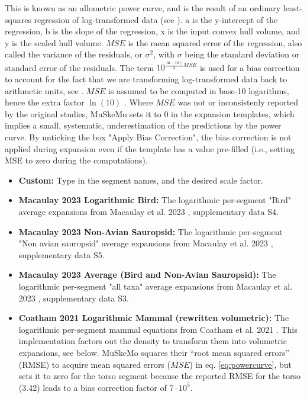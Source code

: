 \documentclass{article}
\begin{document}
This is known as an allometric power curve, and is the result of an ordinary least-squares regression of log-transformed data (see \cite{alexanderPrinciplesAnimalLocomotion2006,brasseyScalingConvexHull2014}). a is the y-intercept of the regression, b is the slope of the regression, x is the input convex hull volume, and y is the scaled hull volume. \(MSE\) is the mean squared error of the regression, also called the variance of the residuals, or $\sigma^2$, with $\sigma$ being the standard deviation or standard error of the residuals. The term $10^{\frac{\ln(10)}{2} MSE }$ is used for a bias correction to account for the fact that we are transforming log-transformed data back to arithmetic units, see \cite{baskervilleUseLogarithmicRegression1972,sprugelCorrectingBiasLogTransformed1983,smithLogarithmicTransformationBias1993}. $MSE$ is assumed to be computed in base-10 logarithms, hence the extra factor $\ln(10)$ \cite{sprugelCorrectingBiasLogTransformed1983,smithLogarithmicTransformationBias1993}. Where $MSE$ was not or inconsistenly reported by the original studies, MuSkeMo sets it to 0 in the expansion templates, which implies a small, systematic, underestimation of the predictions by the power curve. By unticking the box "Apply Bias Correction", the bias correction is not applied during expansion even if the template has a value pre-filled (i.e., setting MSE to zero during the computations).


\begin{itemize}
    \item \textbf{Custom:} Type in the segment names, and the desired scale factor.
    \item \textbf{Macaulay 2023 Logarithmic Bird:} The logarithmic per-segment "Bird" average expansions from Macaulay et al. 2023 \cite{macaulayDecouplingBodyShape2023}, supplementary data S4.
    \item \textbf{Macaulay 2023 Non-Avian Sauropsid:} The logarithmic per-segment "Non avian sauropsid" average expansions from Macaulay et al. 2023 \cite{macaulayDecouplingBodyShape2023}, supplementary data S5.
    \item \textbf{Macaulay 2023 Average (Bird and Non-Avian Sauropsid):} The logarithmic per-segment "all taxa" average expansions from Macaulay et al. 2023 \cite{macaulayDecouplingBodyShape2023}, supplementary data S3.
    \item \textbf{Coatham 2021 Logarithmic Mammal (rewritten volumetric):} The logarithmic per-segment mammal equations from Coatham et al. 2021 \cite{coathamConvexHullEstimation2021}. This implementation factors out the density to transform them into volumetric expansions, see below. MuSkeMo squares their ``root mean squared errors'' (RMSE) to acquire mean squared errors ($MSE$) in eq. \ref{eq:powercurve}, but sets it to zero for the torso segment because the reported RMSE for the torso (3.42) leads to a bias correction factor of \(7 \cdot 10^{5}\).
\end{itemize}
\end{document}
